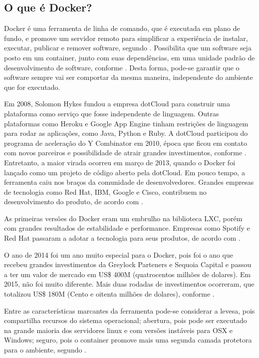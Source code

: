 \documentclass[
	12pt,				%
	openright,			%
	oneside,			%
	a4paper,			%
	chapter=TITLE,		%
	section=TITLE,		%
	english,			%
	french,				%
	spanish,			%
	brazil				%
	]{abntex2}
\begin{document}
\subsection{O que é Docker?}

Docker é uma ferramenta de linha de comando, que é executada em plano de fundo, e promove um servidor remoto para simplificar a experiência de instalar, executar, publicar e remover software, segundo . Possibilita que um software seja posto em um container, junto com suas dependências, em uma unidade padrão de desenvolvimento de software, conforme . Desta forma, pode-se garantir que o software sempre vai ser comportar da mesma maneira, independente do ambiente que for executado.

Em 2008, Solomon Hykes fundou a empresa dotCloud para construir uma plataforma como serviço que fosse independente de linguagem. Outras plataformas como Heroku e Google App Engine tinham restrições de linguagem para rodar as aplicações, como Java, Python e Ruby. A dotCloud participou do programa de aceleração do Y Combinator em 2010, época que ficou em contato com novos parceiros e possibilidade de atrair grandes investimentos, conforme . Entretanto, a maior virada ocorreu em março de 2013, quando o Docker foi lançado como um projeto de código aberto pela dotCloud. Em pouco tempo, a ferramenta caiu nos braços da comunidade de desenvolvedores. Grandes empresas de tecnologia como Red Hat, IBM, Google e Cisco, contribuem no desenvolvimento do produto, de acordo com .

As primeiras versões do Docker eram um embrulho na biblioteca LXC, porém com grandes resultados de estabilidade e performance. Empresas como Spotify e Red Hat passaram a adotar a tecnologia para seus produtos, de acordo com .

O ano de 2014 foi um ano muito especial para o Docker, pois foi o ano que recebeu grandes investimentos da Greylock Parteners e Sequoia Capital e passou a ter um valor de mercado em US\$ 400M (quatrocentos milhões de dolares). Em 2015, não foi muito diferente. Mais duas rodadas de investimentos ocorreram, que totalizou US\$ 180M (Cento e oitenta milhões de dolares), conforme  . 

Entre as características marcantes da ferramenta pode-se considerar a levesa, pois compartilha recursos do sistema operacional; abertura, pois pode ser executado na grande maioria dos servidores linux e com versões instáveis para OSX e Windows; seguro, pois o container promove mais uma segunda camada protetora para o ambiente, segundo .
\end{document}
